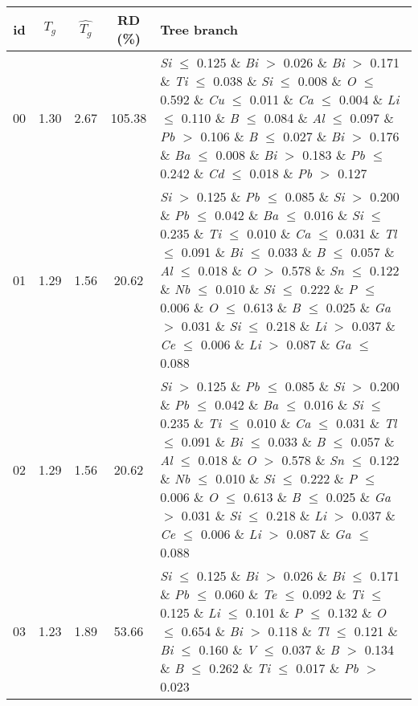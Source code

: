 \begin{table}[!htbp]
	\setlength{\tabcolsep}{3pt}
	\begin{tabular}{ccccp{}}
		\toprule
		id & $T_g$ & $\hat{T_g}$ & RD (\%) & Tree branch\\
		\midrule
		00 & 1.30 & 2.67 & 105.38 & \textit{Si} $\le$ 0.125 $\&$ \textit{Bi} $>$ 0.026 $\&$ \textit{Bi} $>$ 0.171 $\&$ \textit{Ti} $\le$ 0.038 $\&$ \textit{Si} $\le$ 0.008 $\&$ \textit{O} $\le$ 0.592 $\&$ \textit{Cu} $\le$ 0.011 $\&$ \textit{Ca} $\le$ 0.004 $\&$ \textit{Li} $\le$ 0.110 $\&$ \textit{B} $\le$ 0.084 $\&$ \textit{Al} $\le$ 0.097 $\&$ \textit{Pb} $>$ 0.106 $\&$ \textit{B} $\le$ 0.027 $\&$ \textit{Bi} $>$ 0.176 $\&$ \textit{Ba} $\le$ 0.008 $\&$ \textit{Bi} $>$ 0.183 $\&$ \textit{Pb} $\le$ 0.242 $\&$ \textit{Cd} $\le$ 0.018 $\&$ \textit{Pb} $>$ 0.127\\
		\hline
		01 & 1.29 & 1.56 & 20.62 & \textit{Si} $>$ 0.125 $\&$ \textit{Pb} $\le$ 0.085 $\&$ \textit{Si} $>$ 0.200 $\&$ \textit{Pb} $\le$ 0.042 $\&$ \textit{Ba} $\le$ 0.016 $\&$ \textit{Si} $\le$ 0.235 $\&$ \textit{Ti} $\le$ 0.010 $\&$ \textit{Ca} $\le$ 0.031 $\&$ \textit{Tl} $\le$ 0.091 $\&$ \textit{Bi} $\le$ 0.033 $\&$ \textit{B} $\le$ 0.057 $\&$ \textit{Al} $\le$ 0.018 $\&$ \textit{O} $>$ 0.578 $\&$ \textit{Sn} $\le$ 0.122 $\&$ \textit{Nb} $\le$ 0.010 $\&$ \textit{Si} $\le$ 0.222 $\&$ \textit{P} $\le$ 0.006 $\&$ \textit{O} $\le$ 0.613 $\&$ \textit{B} $\le$ 0.025 $\&$ \textit{Ga} $>$ 0.031 $\&$ \textit{Si} $\le$ 0.218 $\&$ \textit{Li} $>$ 0.037 $\&$ \textit{Ce} $\le$ 0.006 $\&$ \textit{Li} $>$ 0.087 $\&$ \textit{Ga} $\le$ 0.088\\
		\hline
		02 & 1.29 & 1.56 & 20.62 & \textit{Si} $>$ 0.125 $\&$ \textit{Pb} $\le$ 0.085 $\&$ \textit{Si} $>$ 0.200 $\&$ \textit{Pb} $\le$ 0.042 $\&$ \textit{Ba} $\le$ 0.016 $\&$ \textit{Si} $\le$ 0.235 $\&$ \textit{Ti} $\le$ 0.010 $\&$ \textit{Ca} $\le$ 0.031 $\&$ \textit{Tl} $\le$ 0.091 $\&$ \textit{Bi} $\le$ 0.033 $\&$ \textit{B} $\le$ 0.057 $\&$ \textit{Al} $\le$ 0.018 $\&$ \textit{O} $>$ 0.578 $\&$ \textit{Sn} $\le$ 0.122 $\&$ \textit{Nb} $\le$ 0.010 $\&$ \textit{Si} $\le$ 0.222 $\&$ \textit{P} $\le$ 0.006 $\&$ \textit{O} $\le$ 0.613 $\&$ \textit{B} $\le$ 0.025 $\&$ \textit{Ga} $>$ 0.031 $\&$ \textit{Si} $\le$ 0.218 $\&$ \textit{Li} $>$ 0.037 $\&$ \textit{Ce} $\le$ 0.006 $\&$ \textit{Li} $>$ 0.087 $\&$ \textit{Ga} $\le$ 0.088\\
		\hline
		03 & 1.23 & 1.89 & 53.66 & \textit{Si} $\le$ 0.125 $\&$ \textit{Bi} $>$ 0.026 $\&$ \textit{Bi} $\le$ 0.171 $\&$ \textit{Pb} $\le$ 0.060 $\&$ \textit{Te} $\le$ 0.092 $\&$ \textit{Ti} $\le$ 0.125 $\&$ \textit{Li} $\le$ 0.101 $\&$ \textit{P} $\le$ 0.132 $\&$ \textit{O} $\le$ 0.654 $\&$ \textit{Bi} $>$ 0.118 $\&$ \textit{Tl} $\le$ 0.121 $\&$ \textit{Bi} $\le$ 0.160 $\&$ \textit{V} $\le$ 0.037 $\&$ \textit{B} $>$ 0.134 $\&$ \textit{B} $\le$ 0.262 $\&$ \textit{Ti} $\le$ 0.017 $\&$ \textit{Pb} $>$ 0.023\\

\end{tabular}
\end{table}

